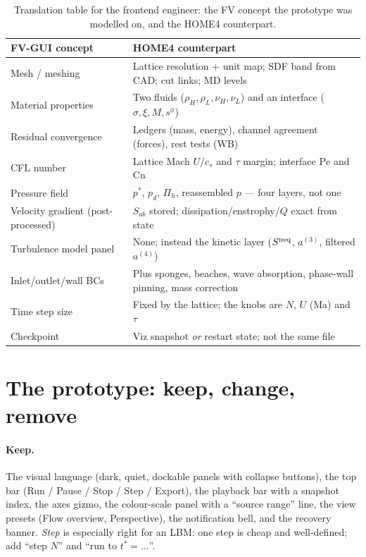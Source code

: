 \documentclass[11pt,a4paper]{article}
\newcommand{\Pe}{\mathrm{Pe}}
\newcommand{\Cn}{\mathrm{Cn}}
\newcommand{\cs}{c_s}
\newcommand{\ps}{p^\ast}
\newcommand{\pd}{p_d}
\newcommand{\Pih}{\Pi_h}
\begin{document}
\begin{table}[H]
\centering\small
\caption{Translation table for the frontend engineer: the FV concept the prototype
was modelled on, and the HOME4 counterpart.}
\begin{tabular}{L{4.2cm}L{10.8cm}}
\toprule
FV-GUI concept & HOME4 counterpart \\
\midrule
Mesh / meshing & Lattice resolution + unit map; SDF band from CAD; cut links; MD levels \\
Material properties & Two fluids ($\rho_H,\rho_L,\nu_H,\nu_L$) and an interface ($\sigma,\xi,M,s^\phi$) \\
Residual convergence & Ledgers (mass, energy), channel agreement (forces), rest tests (WB) \\
CFL number & Lattice Mach $U/\cs$ and $\tau$ margin; interface $\Pe$ and $\Cn$ \\
Pressure field & $\ps$, $\pd$, $\Pih$, reassembled $p$ --- four layers, not one \\
Velocity gradient (post-processed) & $S_{ab}$ stored; dissipation/enstrophy/$Q$ exact from state \\
Turbulence model panel & None; instead the kinetic layer ($S^{\rm neq}$, $a^{(3)}$, filtered $a^{(4)}$) \\
Inlet/outlet/wall BCs & Plus sponges, beaches, wave absorption, phase-wall pinning, mass correction \\
Time step size & Fixed by the lattice; the knobs are $N$, $U$ (Ma) and $\tau$ \\
Checkpoint & Viz snapshot \emph{or} restart state; not the same file \\
\bottomrule
\end{tabular}
\end{table}

\section{The prototype: keep, change, remove}\label{sec:proto}
\paragraph{Keep.} The visual language (dark, quiet, dockable panels with
collapse buttons), the top bar (Run / Pause / Stop / Step / Export), the playback bar
with a snapshot index, the axes gizmo, the colour-scale panel with a ``source
range'' line, the view presets (Flow overview, Perspective), the notification
bell, and the recovery banner. \emph{Step} is especially right for an LBM: one step
is cheap and well-defined; add ``step $N$'' and ``run to $t^\ast=\ldots$''.
\end{document}
